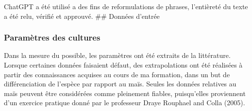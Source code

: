 \documentclass[
]{article}
\begin{document}
ChatGPT a été utilisé a des fins de reformulations de phrases,
l'entièreté du texte a été relu, vérifié et approuvé. \#\# Données
d'entrée

\subsubsection{Paramètres des
cultures}\label{paramuxe8tres-des-cultures}

Dans la mesure du possible, les paramètres ont été extraits de la
littérature. Lorsque certaines données faisaient défaut, des
extrapolations ont été réalisées à partir des connaissances acquises au
cours de ma formation, dans un but de différenciation de l'espèce par
rapport au maïs. Seules les données relatives au maïs peuvent être
considérées comme pleinement fiables, puisqu'elles proviennent d'un
exercice pratique donné par le professeur Draye Rouphael and Colla
(2005).
\end{document}
